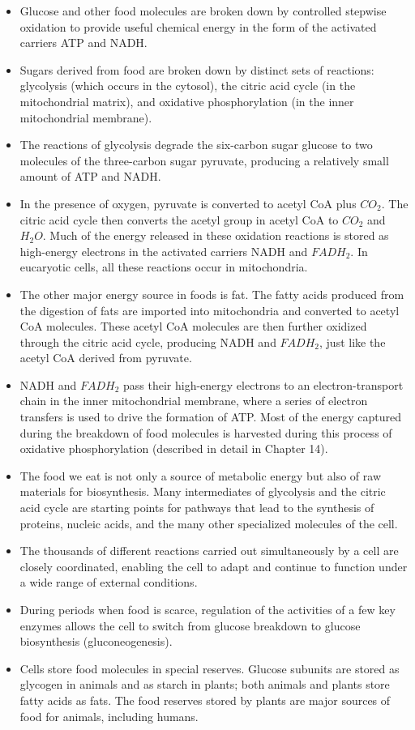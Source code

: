 \begin{itemize}
\item Glucose and other food molecules are broken down by controlled
stepwise oxidation to provide useful chemical energy in the form of
the activated carriers ATP and NADH.
\item Sugars derived from food are broken down by distinct sets of reactions:
glycolysis (which occurs in the cytosol), the citric acid cycle
(in the mitochondrial matrix), and oxidative phosphorylation (in the
inner mitochondrial membrane).
\item The reactions of glycolysis degrade the six-carbon sugar glucose to
two molecules of the three-carbon sugar pyruvate, producing a relatively
small amount of ATP and NADH.
\item In the presence of oxygen, pyruvate is converted to acetyl CoA plus
$CO_2$. The citric acid cycle then converts the acetyl group in acetyl
CoA to $CO_2$ and $H_{2}O$. Much of the energy released in these oxidation
reactions is stored as high-energy electrons in the activated carriers
NADH and $FADH_2$. In eucaryotic cells, all these reactions occur in
mitochondria.
\item The other major energy source in foods is fat. The fatty acids produced
from the digestion of fats are imported into mitochondria and
converted to acetyl CoA molecules. These acetyl CoA molecules are
then further oxidized through the citric acid cycle, producing NADH
and $FADH_2$, just like the acetyl CoA derived from pyruvate.
\item NADH and $FADH_2$ pass their high-energy electrons to an electron-transport
chain in the inner mitochondrial membrane, where a series
of electron transfers is used to drive the formation of ATP. Most of
the energy captured during the breakdown of food molecules is harvested
during this process of oxidative phosphorylation (described in
detail in Chapter 14).
\item The food we eat is not only a source of metabolic energy but also of
raw materials for biosynthesis. Many intermediates of glycolysis and
the citric acid cycle are starting points for pathways that lead to the
synthesis of proteins, nucleic acids, and the many other specialized
molecules of the cell.
\item The thousands of different reactions carried out simultaneously by a
cell are closely coordinated, enabling the cell to adapt and continue
to function under a wide range of external conditions.
\item During periods when food is scarce, regulation of the activities of a
few key enzymes allows the cell to switch from glucose breakdown
to glucose biosynthesis (gluconeogenesis).
\item Cells store food molecules in special reserves. Glucose subunits are
stored as glycogen in animals and as starch in plants; both animals
and plants store fatty acids as fats. The food reserves stored by plants
are major sources of food for animals, including humans.
\end{itemize}

